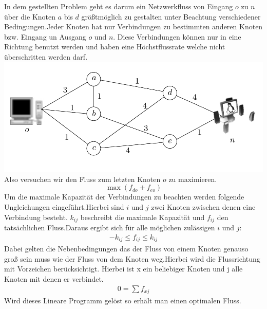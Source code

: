 	In dem gestellten Problem geht es darum ein Netzwerkfluss von Eingang $o$ zu $n$ über die Knoten $a$ bis $d$ größtmöglich zu gestalten unter Beachtung verschiedener Bedingungen.Jeder Knoten hat nur Verbindungen zu bestimmten anderen Knoten bzw. Eingang un Ausgang $o$ und $n$. Diese Verbindungen können nur in eine Richtung benutzt werden und haben eine Höchstflussrate welche nicht überschritten werden darf. 
	\includegraphics[width=\textwidth]{Grafiken/Netzwerkfluss_Bild.png}
	Also versuchen wir den Fluss zum letzten Knoten $o$ zu maximieren.
	\[ \max(f_{do}+f_{eo}) \]
	Um die maximale Kapazität der Verbindungen zu beachten werden folgende Ungleichungen eingeführt.Hierbei sind $i$ und $j$ zwei Knoten zwischen denen eine Verbindung besteht. $k_{ij}$ beschreibt die maximale Kapazität und $f_{ij}$ den tatsächlichen Fluss.Daraus ergibt sich für alle möglichen zulässigen $i$ und $j$:  
	\begin{align*}
		-k_{ij} \leq f_{ij} \leq k_{ij}
	\end{align*}
	Dabei gelten die Nebenbedingungen das der Fluss von einem Knoten genauso groß sein muss wie der Fluss von dem Knoten weg.Hierbei wird die Flussrichtung mit Vorzeichen berücksichtigt. Hierbei ist x ein beliebiger Knoten und j alle Knoten mit denen er verbindet.
	\begin{align*}
	0=\sum{f_{xj}}
	\end{align*}
	Wird dieses Lineare Programm gelöst so erhält man einen optimalen Fluss. 
	
	
	
	
